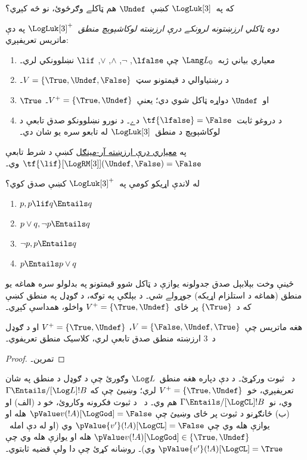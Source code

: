 \documentclass[../../../include/open-logic-section]{subfiles}
\begin{document}
که په~$\LogLuk[3]$ کښې~$\Undef$ هم ټاکلے وګرځوئ، نو څه کېږي؟

\begin{defn}
  \emph{دوه ټاکلي ارزښتونه لرونکے درې ارزښته لوکاشېوېچ منطق}~$\LogLuk[3]^{+}$ په دې ماتريس تعريفېږي:
  \begin{enumerate}
    \item معياري بياني ژبه~$\Lang L_0$ چې
    $\lfalse$, $\lnot$, $\land$, $\lor$, $\lif$ نښلوونکي لري۔
    \item د رښتياوالي د قيمتونو سټ~$V = \{\True, \Undef, \False\}$۔
    \item $\True$ او~$\Undef$ دواړه ټاکل شوي دي؛ يعنې~$V^+ = \{\True, \Undef\}$۔
    \item د دروغو ثابت~$\tf{\lfalse} = \False$ دے۔ د نورو نښلوونکو صدق تابعې د لوکاشېوېچ د منطق~$\LogLuk[3]$ له تابعو سره يو شان دي۔
  \end{enumerate}
\end{defn}
په \href{https://pure.unamur.be/ws/portalfiles/portal/53362118/2016_DegauquierV_article.pdf}{معياري درې ارزښته آر-مينګل} کښې د شرط تابعې $\tf{\lif}[\LogRM[3]](\Undef,\False)=\False$ وي۔

\begin{prob}
  له لاندې اړيکو کومې په~$\LogLuk[3]^{+}$ کښې صدق کوي؟
  \begin{enumerate}
    \item $p, p \lif q \Entails q$
    \item $p \lor q, \lnot p \Entails q$
    \item $\lnot p, p \Entails q$
    \item $p \Entails p \lor q$
  \end{enumerate}
\end{prob}

ځينې وخت بېلابېل صدق جدولونه يوازې د ټاکل شوو قيمتونو په بدلولو
سره هماغه يو منطق (هماغه د استلزام اړيکه) جوړولے شي۔ د بېلګې په
توګه، د ګوډل په منطق کښې که د~$\{\True\}$ پر ځای~$V^+ = \{\True,
\Undef\}$ واخلو، همداسې کېږي۔

\begin{prop}
  هغه ماتريس چې~$V = \{\False, \Undef,\True\}$، $V^+=\{\True,
  \Undef\}$ او د ګوډل د~$3$ ارزښته منطق صدق تابعې لري،
  کلاسيک منطق تعريفوي۔
\end{prop}

\begin{proof}
  تمرين۔
\end{proof}

\begin{prob}
  د~ ثبوت ورکړئ۔ د دې دپاره
  هغه منطق~$\Log L$ وګورئ چې د ګوډل د منطق په شان تعريفېږي،
  خو~$V^+=\{\True,\Undef\}$ لري؛ وښيئ چې که
  $\Gamma \Entails/[\Log L] !B$ وي، نو~$\Gamma \Entails/[\LogCL] !B$
  هم وي۔ د~ د ثبوت فکرونه
  وکاروئ، خو د (الف) او (ب) ځانګړنو د ثبوت پر ځای وښيئ چې
  $\pValue v(!A)[\LogGod] = \False$ هله او يوازې هله وي چې
  $\pValue {v'}(!A)[\LogCL] = \False$ وي (او له دې امله~$\pValue
  v(!A)[\LogGod] \in \{\True,\Undef\}$ هله او يوازې هله وي چې
  $\pValue {v'}(!A)[\LogCL] =
  \True$ وي)۔ روښانه کړئ چې دا ولې قضيه ثابتوي۔
\end{prob}
\end{document}
